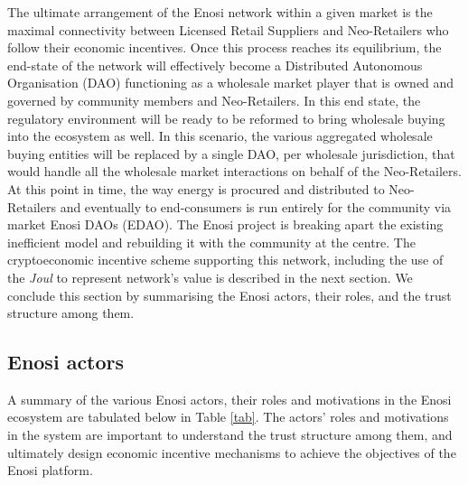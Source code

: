 \documentclass[a4paper,12pt,reqno]{amsart}
\theoremstyle{definition}
\begin{document}
The ultimate arrangement of the Enosi network within a given market is the maximal connectivity between Licensed Retail Suppliers and Neo-Retailers who follow their economic incentives. Once this process reaches its equilibrium, the end-state of the network will effectively become a Distributed Autonomous Organisation (DAO) functioning as a wholesale market player that is owned and governed by community members and Neo-Retailers. In this end state, the regulatory environment will be ready to be reformed to bring wholesale buying into the ecosystem as well. In this scenario, the various aggregated wholesale buying entities will be replaced by a single DAO, per wholesale jurisdiction, that would handle all the wholesale market interactions on behalf of the Neo-Retailers. At this point in time, the way energy is procured and distributed to Neo-Retailers and eventually to end-consumers is run entirely for the community via market Enosi DAOs (EDAO). The Enosi project is breaking apart the existing inefficient model and rebuilding it with the community at the centre. The cryptoeconomic incentive scheme supporting this network, including the use of the \textit{Joul} to represent network's value is described in the next section. We conclude this section by summarising the Enosi actors, their roles, and the trust structure among them. 
% 
% 
% 
%
% 
% 

\subsection*{Enosi actors} A summary of the various Enosi actors, their roles and motivations in the Enosi ecosystem are tabulated below in Table \ref{tab}. The actors' roles and motivations in the system are important to understand the trust structure among them, and ultimately design economic incentive mechanisms to achieve the objectives of the Enosi platform. 


\newpage
\end{document}
